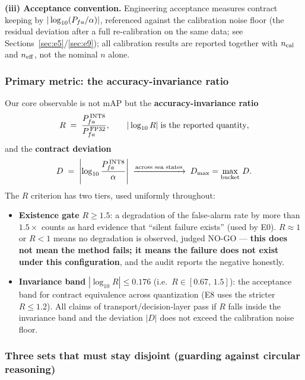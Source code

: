 \textbf{(iii) Acceptance convention.}
Engineering acceptance measures contract keeping by $|\log_{10}(P_{fa}/\alpha)|$, referenced against the calibration noise floor (the residual deviation after a full re-calibration on the same data; see Sections~\ref{sec:e5}/\ref{sec:e9}); all calibration results are reported together with $n_{\mathrm{cal}}$ and $n_{\mathrm{eff}}$, not the nominal $n$ alone.

\subsubsection{Primary metric: the accuracy-invariance ratio}
\label{sec:R-def}

Our core observable is not mAP but the \textbf{accuracy-invariance ratio}
\begin{equation}
R \;=\; \frac{P_{fa}^{\,\mathrm{INT8}}}{P_{fa}^{\,\mathrm{FP32}}},
\qquad
|\log_{10} R| \;\text{is the reported quantity},
\label{eq:R}
\end{equation}
and the \textbf{contract deviation}
\begin{equation}
D \;=\; \left|\log_{10}\frac{P_{fa}^{\,\mathrm{INT8}}}{\alpha}\right|
\;\xrightarrow{\text{across sea states}}\; D_{\max}=\max_{\text{bucket}}\,D .
\label{eq:deviation}
\end{equation}
The $R$ criterion has two tiers, used uniformly throughout:

\begin{itemize}
\item \textbf{Existence gate} $R\ge 1.5$: a degradation of the false-alarm rate by more than $1.5\times$ counts as hard evidence that ``silent failure exists'' (used by E0). $R\approx1$ or $R<1$ means no degradation is observed, judged NO-GO --- \textbf{this does not mean the method fails; it means the failure does not exist under this configuration}, and the audit reports the negative honestly.
\item \textbf{Invariance band} $|\log_{10}R|\le 0.176$ (i.e.\ $R\in[0.67,\,1.5]$): the acceptance band for contract equivalence across quantization (E8 uses the stricter $R\le1.2$). All claims of transport/decision-layer pass if $R$ falls inside the invariance band and the deviation $|D|$ does not exceed the calibration noise floor.
\end{itemize}

\subsubsection{Three sets that must stay disjoint (guarding against circular reasoning)}
\label{sec:three-sets}


